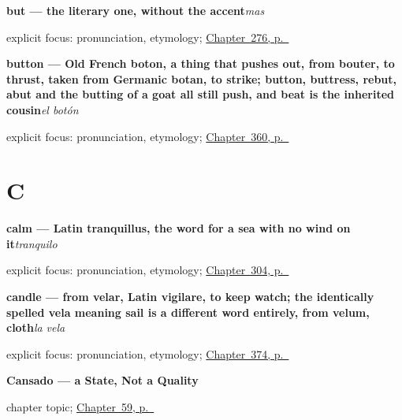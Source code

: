 \noindent\begin{minipage}[t]{\linewidth}
\raggedright
\textbf{but — the literary one, without the accent}\enspace\emph{mas}\par
\footnotesize explicit focus: pronunciation, etymology; \hyperref[ch:literario]{Chapter~276, p.~\pageref*{ch:literario}}
\end{minipage}\par\smallskip

\noindent\begin{minipage}[t]{\linewidth}
\raggedright
\textbf{button — Old French boton, a thing that pushes out, from bouter, to thrust, taken from Germanic botan, to strike; button, buttress, rebut, abut and the butting of a goat all still push, and beat is the inherited cousin}\enspace\emph{el botón}\par
\footnotesize explicit focus: pronunciation, etymology; \hyperref[ch:la-ropa-y-el-zapato]{Chapter~360, p.~\pageref*{ch:la-ropa-y-el-zapato}}
\end{minipage}\par\smallskip

\section*{C}

\noindent\begin{minipage}[t]{\linewidth}
\raggedright
\textbf{calm — Latin tranquillus, the word for a sea with no wind on it}\enspace\emph{tranquilo}\par
\footnotesize explicit focus: pronunciation, etymology; \hyperref[ch:como-estoy]{Chapter~304, p.~\pageref*{ch:como-estoy}}
\end{minipage}\par\smallskip

\noindent\begin{minipage}[t]{\linewidth}
\raggedright
\textbf{candle — from velar, Latin vigilare, to keep watch; the identically spelled vela meaning sail is a different word entirely, from velum, cloth}\enspace\emph{la vela}\par
\footnotesize explicit focus: pronunciation, etymology; \hyperref[ch:el-lapiz-y-el-cepillo]{Chapter~374, p.~\pageref*{ch:el-lapiz-y-el-cepillo}}
\end{minipage}\par\smallskip

\noindent\begin{minipage}[t]{\linewidth}
\raggedright
\textbf{Cansado --- a State, Not a Quality}\par
\footnotesize chapter topic; \hyperref[ch:cansado]{Chapter~59, p.~\pageref*{ch:cansado}}
\end{minipage}\par\smallskip

